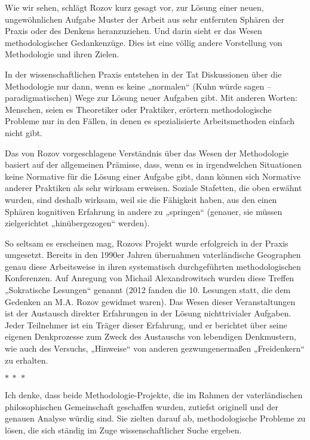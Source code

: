 \documentclass[11pt,a4paper]{article}
\begin{document}
Wie wir sehen, schlägt Rozov kurz gesagt vor, zur Lösung einer neuen,
ungewöhnlichen Aufgabe Muster der Arbeit aus sehr entfernten Sphären der
Praxis oder des Denkens heranzuziehen.  Und darin sieht er das Wesen
methodologischer Gedankenzüge. Dies ist eine völlig andere Vorstellung von
Methodologie und ihren Zielen.

In der wissenschaftlichen Praxis entstehen in der Tat Diskussionen über die
Methodologie nur dann, wenn es keine „normalen“ (Kuhn würde sagen --
paradigmatischen) Wege zur Lösung neuer Aufgaben gibt. Mit anderen Worten:
Menschen, seien es Theoretiker oder Praktiker, erörtern methodologische
Probleme nur in den Fällen, in denen es spezialisierte Arbeitsmethoden einfach
nicht gibt.

Das von Rozov vorgeschlagene Verständnis über das Wesen der Methodologie
basiert auf der allgemeinen Prämisse, dass, wenn es in irgendwelchen
Situationen keine Normative für die Lösung einer Aufgabe gibt, dann können
sich Normative anderer Praktiken als sehr wirksam erweisen. Soziale Stafetten,
die oben erwähnt wurden, sind deshalb wirksam, weil sie die Fähigkeit haben,
aus den einen Sphären kognitiven Erfahrung in andere zu „springen“ (genauer,
sie müssen zielgerichtet „hinübergezogen“ werden).

So seltsam es erscheinen mag, Rozovs Projekt wurde erfolgreich in der Praxis
umgesetzt. Bereits in den 1990er Jahren übernahmen vaterländische Geographen
genau diese Arbeitsweise in ihren systematisch durchgeführten methodologischen
Konferenzen. Auf Anregung von Michail Alexandrowitsch wurden diese Treffen
„Sokratische Lesungen“ genannt (2012 fanden die 10. Lesungen statt, die dem
Gedenken an M.A. Rozov gewidmet waren). Das Wesen dieser Veranstaltungen ist
der Austausch direkter Erfahrungen in der Lösung nichttrivialer Aufgaben.
Jeder Teilnehmer ist ein Träger dieser Erfahrung, und er berichtet über seine
eigenen Denkprozesse zum Zweck des Austauschs von lebendigen Denkmustern, wie
auch des Versuchs, „Hinweise“ von anderen gezwungenermaßen „Freidenkern“ zu
erhalten.
\begin{center}
  $\ast\ \ast\ \ast$
\end{center}

Ich denke, dass beide Methodologie-Projekte, die im Rahmen der vaterländischen
philosophischen Gemeinschaft geschaffen wurden, zutiefst originell und der
genauen Analyse würdig sind.  Sie zielten darauf ab, methodologische Probleme
zu lösen, die sich ständig im Zuge wissenschaftlicher Suche ergeben.
\end{document}

